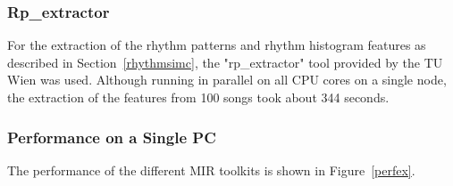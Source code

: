 \subsubsection{Rp\_extractor}

For the extraction of the rhythm patterns and rhythm histogram features as described in Section~\ref{rhythmsimc}, the "rp\_extractor" tool provided by the TU Wien was used. Although running in parallel on all CPU cores on a single node, the extraction of the features from 100 songs took about 344 seconds.

\subsubsection{Performance on a Single PC}

The performance of the different MIR toolkits is shown in Figure~\ref{perfex}. 

